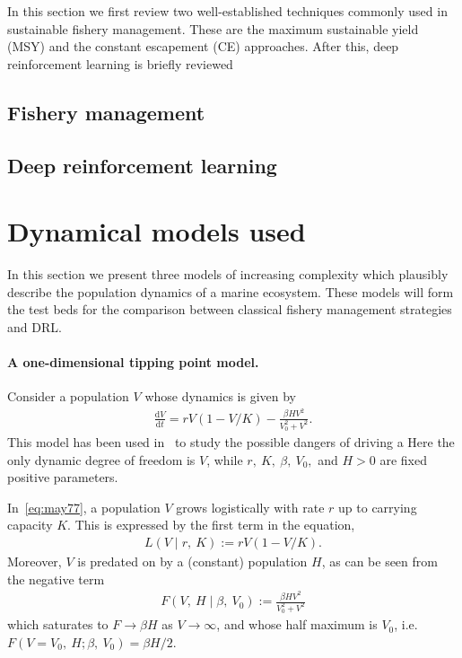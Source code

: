 \documentclass[smallextended]{svjour3}       %
\newcommand*{\der}[2]{\frac{\mathrm{d}#1}{\mathrm{d}#2}}
\def\div{\;|\;}
\begin{document}
In this section we first review two well-established techniques commonly used in sustainable fishery management. 
These are the maximum sustainable yield (MSY) and the constant escapement (CE) approaches. 
After this, deep reinforcement learning is briefly reviewed

\hypertarget{sec:2}{%
\subsection{Fishery management}\label{sec:fishery}}

\hypertarget{sec:3}{%
\subsection{Deep reinforcement learning}\label{sec:rl}}

\hypertarget{sec:4}{%
\section{Dynamical models used}\label{sec:model}}

In this section we present three models of increasing complexity which plausibly describe the population dynamics of a marine ecosystem.
These models will form the test beds for the comparison between classical fishery management strategies and DRL.

\hypertarget{paragraph-headings}{%
\paragraph{A one-dimensional tipping point model.}\label{p:may}}

Consider a population $V$ whose dynamics is given by
\begin{align}
  \label{eq:may77}
  \der{V}{t} = rV\left(
    1-V/K
    \right) 
    -
    \frac{\beta H V^2}{V_0^2 + V^2}. 
\end{align}
This model has been used in~\cite{may77} to study the possible dangers of driving a 
Here the only dynamic degree of freedom is $V$, while $r,\ K,\ \beta,\ V_0,$ and $H > 0$ are fixed positive parameters.

In~\eqref{eq:may77}, a population $V$ grows logistically with rate $r$ up to carrying capacity $K$.
This is expressed by the first term in the equation,
\begin{align*}
  L(V \div r,\ K) := rV\left(1 - V / K\right).
\end{align*}
Moreover, $V$ is predated on by a (constant) population $H$, as can be seen from the negative term
\begin{align*}
  F(V,\ H \div \beta,\ V_0) := \frac{\beta H V^2}{V_0^2 + V^2}
\end{align*}
which saturates to $F\to\beta H$ as $V\to\infty$, and whose half maximum is $V_0$, i.e.\ $F(V=V_0,\ H; \beta,\ V_0)=\beta H/2$.
\end{document}
